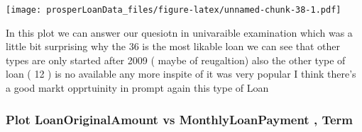 \documentclass[]{article}
\newenvironment{Shaded}{\begin{snugshade}}{\end{snugshade}}
\newcommand{\DataTypeTok}[1]{\textcolor[rgb]{0.13,0.29,0.53}{#1}}
\newcommand{\DecValTok}[1]{\textcolor[rgb]{0.00,0.00,0.81}{#1}}
\newcommand{\FloatTok}[1]{\textcolor[rgb]{0.00,0.00,0.81}{#1}}
\newcommand{\KeywordTok}[1]{\textcolor[rgb]{0.13,0.29,0.53}{\textbf{#1}}}
\newcommand{\NormalTok}[1]{#1}
\newcommand{\OperatorTok}[1]{\textcolor[rgb]{0.81,0.36,0.00}{\textbf{#1}}}
\newcommand{\StringTok}[1]{\textcolor[rgb]{0.31,0.60,0.02}{#1}}
\begin{document}
\begin{Shaded}
\end{Shaded}

\texttt{[image: prosperLoanData\_files/figure-latex/unnamed-chunk-38-1.pdf]}

In this plot we can answer our quesiotn in univaraible examination which
was a little bit surprising why the 36 is the most likable loan we can
see that other types are only started after 2009 ( maybe of reugaltion)
also the other type of loan ( 12 ) is no available any more inspite of
it was very popular I think there's a good markt opprtuinity in prompt
again this type of Loan

\hypertarget{plot-loanoriginalamount-vs-monthlyloanpayment-term}{%
\subsubsection{Plot LoanOriginalAmount vs MonthlyLoanPayment ,
Term}\label{plot-loanoriginalamount-vs-monthlyloanpayment-term}}
\end{document}

